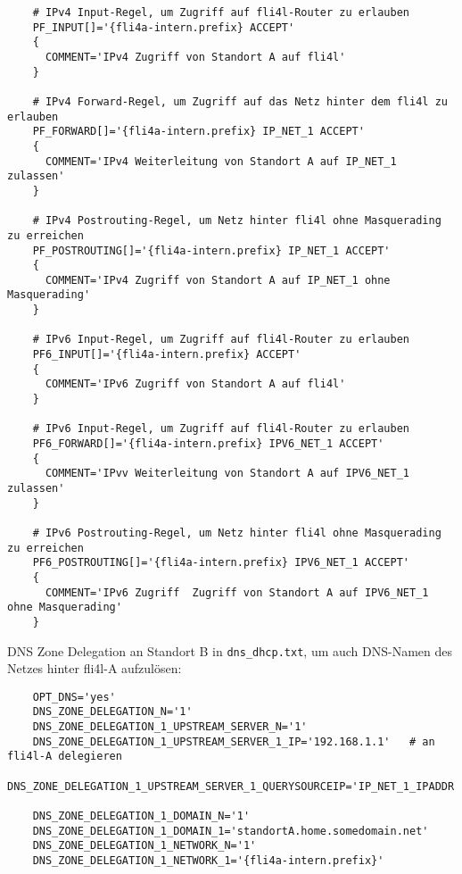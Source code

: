 \begin{example}
\begin{verbatim}
    # IPv4 Input-Regel, um Zugriff auf fli4l-Router zu erlauben
    PF_INPUT[]='{fli4a-intern.prefix} ACCEPT'
    {
      COMMENT='IPv4 Zugriff von Standort A auf fli4l'
    }
    
    # IPv4 Forward-Regel, um Zugriff auf das Netz hinter dem fli4l zu erlauben
    PF_FORWARD[]='{fli4a-intern.prefix} IP_NET_1 ACCEPT'
    {
      COMMENT='IPv4 Weiterleitung von Standort A auf IP_NET_1 zulassen'
    }
    
    # IPv4 Postrouting-Regel, um Netz hinter fli4l ohne Masquerading zu erreichen
    PF_POSTROUTING[]='{fli4a-intern.prefix} IP_NET_1 ACCEPT'
    {
      COMMENT='IPv4 Zugriff von Standort A auf IP_NET_1 ohne Masquerading'
    }

    # IPv6 Input-Regel, um Zugriff auf fli4l-Router zu erlauben
    PF6_INPUT[]='{fli4a-intern.prefix} ACCEPT'
    {
      COMMENT='IPv6 Zugriff von Standort A auf fli4l'
    }
    
    # IPv6 Input-Regel, um Zugriff auf fli4l-Router zu erlauben
    PF6_FORWARD[]='{fli4a-intern.prefix} IPV6_NET_1 ACCEPT'
    {
      COMMENT='IPvv Weiterleitung von Standort A auf IPV6_NET_1 zulassen'
    }
    
    # IPv6 Postrouting-Regel, um Netz hinter fli4l ohne Masquerading zu erreichen
    PF6_POSTROUTING[]='{fli4a-intern.prefix} IPV6_NET_1 ACCEPT'
    {
      COMMENT='IPv6 Zugriff  Zugriff von Standort A auf IPV6_NET_1 ohne Masquerading'
    }
\end{verbatim}
\end{example}

DNS Zone Delegation an Standort B in \verb+dns_dhcp.txt+, um auch DNS-Namen des Netzes hinter fli4l-A aufzulösen:

\begin{example}
\begin{verbatim}
    OPT_DNS='yes'
    DNS_ZONE_DELEGATION_N='1'
    DNS_ZONE_DELEGATION_1_UPSTREAM_SERVER_N='1'
    DNS_ZONE_DELEGATION_1_UPSTREAM_SERVER_1_IP='192.168.1.1'   # an fli4l-A delegieren
    DNS_ZONE_DELEGATION_1_UPSTREAM_SERVER_1_QUERYSOURCEIP='IP_NET_1_IPADDR'

    DNS_ZONE_DELEGATION_1_DOMAIN_N='1'
    DNS_ZONE_DELEGATION_1_DOMAIN_1='standortA.home.somedomain.net'
    DNS_ZONE_DELEGATION_1_NETWORK_N='1'
    DNS_ZONE_DELEGATION_1_NETWORK_1='{fli4a-intern.prefix}'
\end{verbatim}
\end{example}

